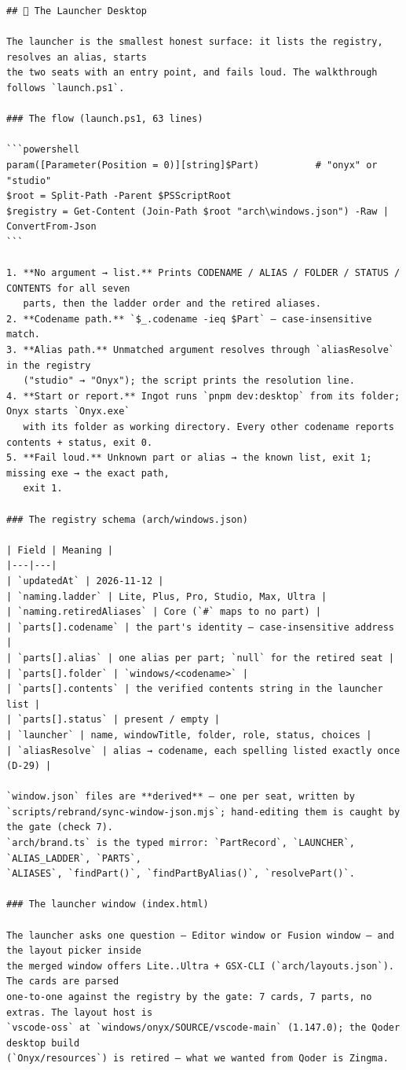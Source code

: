 \begin{Verbatim}[breaklines,breakanywhere,fontsize=\footnotesize]
## 🚀 The Launcher Desktop

The launcher is the smallest honest surface: it lists the registry, resolves an alias, starts
the two seats with an entry point, and fails loud. The walkthrough follows `launch.ps1`.

### The flow (launch.ps1, 63 lines)

```powershell
param([Parameter(Position = 0)][string]$Part)          # "onyx" or "studio"
$root = Split-Path -Parent $PSScriptRoot
$registry = Get-Content (Join-Path $root "arch\windows.json") -Raw | ConvertFrom-Json
```

1. **No argument → list.** Prints CODENAME / ALIAS / FOLDER / STATUS / CONTENTS for all seven
   parts, then the ladder order and the retired aliases.
2. **Codename path.** `$_.codename -ieq $Part` — case-insensitive match.
3. **Alias path.** Unmatched argument resolves through `aliasResolve` in the registry
   ("studio" → "Onyx"); the script prints the resolution line.
4. **Start or report.** Ingot runs `pnpm dev:desktop` from its folder; Onyx starts `Onyx.exe`
   with its folder as working directory. Every other codename reports contents + status, exit 0.
5. **Fail loud.** Unknown part or alias → the known list, exit 1; missing exe → the exact path,
   exit 1.

### The registry schema (arch/windows.json)

| Field | Meaning |
|---|---|
| `updatedAt` | 2026-11-12 |
| `naming.ladder` | Lite, Plus, Pro, Studio, Max, Ultra |
| `naming.retiredAliases` | Core (`#` maps to no part) |
| `parts[].codename` | the part's identity — case-insensitive address |
| `parts[].alias` | one alias per part; `null` for the retired seat |
| `parts[].folder` | `windows/<codename>` |
| `parts[].contents` | the verified contents string in the launcher list |
| `parts[].status` | present / empty |
| `launcher` | name, windowTitle, folder, role, status, choices |
| `aliasResolve` | alias → codename, each spelling listed exactly once (D-29) |

`window.json` files are **derived** — one per seat, written by
`scripts/rebrand/sync-window-json.mjs`; hand-editing them is caught by the gate (check 7).
`arch/brand.ts` is the typed mirror: `PartRecord`, `LAUNCHER`, `ALIAS_LADDER`, `PARTS`,
`ALIASES`, `findPart()`, `findPartByAlias()`, `resolvePart()`.

### The launcher window (index.html)

The launcher asks one question — Editor window or Fusion window — and the layout picker inside
the merged window offers Lite..Ultra + GSX-CLI (`arch/layouts.json`). The cards are parsed
one-to-one against the registry by the gate: 7 cards, 7 parts, no extras. The layout host is
`vscode-oss` at `windows/onyx/SOURCE/vscode-main` (1.147.0); the Qoder desktop build
(`Onyx/resources`) is retired — what we wanted from Qoder is Zingma.


\end{Verbatim}
